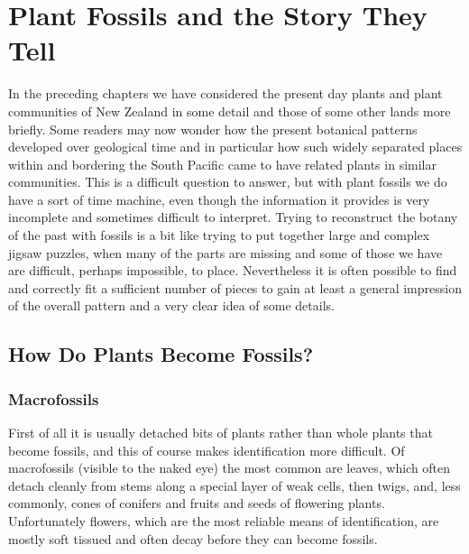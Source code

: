 \chapter{Plant Fossils and the Story They Tell}

In the preceding chapters we have considered the present day plants and plant communities of New Zealand in some detail and those of some other lands more briefly.
Some readers may now wonder how the present botanical patterns developed over geological time and in particular how such widely separated places within and bordering the South Pacific came to have related plants in similar communities.
This is a difficult question to answer, but with plant fossils we do have a sort of time machine, even though the information it provides is very incomplete and sometimes difficult to interpret.
Trying to reconstruct the botany of the past with fossils is a bit like trying to put together large and complex jigsaw puzzles, when many of the parts are missing and some of those we have are difficult, perhaps impossible, to place.
Nevertheless it is often possible to find and correctly fit a sufficient number of pieces to gain at least a general impression of the overall pattern and a very clear idea of some details.

\section{How Do Plants Become Fossils?}

\subsection{Macrofossils}

First of all it is usually detached bits of plants rather than whole plants that become fossils, and this of course makes identification more difficult.
Of macrofossils (visible to the naked eye) the most common are leaves, which often detach cleanly from stems along a special layer of weak cells, then twigs, and, less commonly, cones of conifers and fruits and seeds of flowering plants.
Unfortunately flowers, which are the most reliable means of identification, are mostly soft tissued and often decay before they can become fossils.

